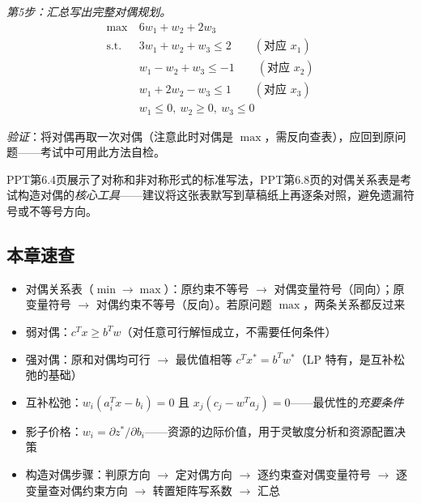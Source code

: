 {\emph{第5步：汇总写出完整对偶规划。}
\[
\begin{aligned}
\max\ & 6w_1 + w_2 + 2w_3 \\
\text{s.t.}\ & 3w_1 + w_2 + w_3 \le 2 \qquad (\text{对应 } x_1)\\
& w_1 - w_2 + w_3 \le -1 \qquad (\text{对应 } x_2)\\
& w_1 + 2w_2 - w_3 \le 1 \qquad (\text{对应 } x_3)\\
& w_1 \le 0,\ w_2 \ge 0,\ w_3 \le 0
\end{aligned}
\]

\emph{验证}：将对偶再取一次对偶（注意此时对偶是 $\max$，需反向查表），应回到原问题——考试中可用此方法自检。

\medskip
PPT第6.4页展示了对称和非对称形式的标准写法，PPT第6.8页的对偶关系表是考试构造对偶的\emph{核心工具}——建议将这张表默写到草稿纸上再逐条对照，避免遗漏符号或不等号方向。
\medskip
{}
\medskip}


\clearpage\subsection{本章速查}

\begin{itemize}
  \item 对偶关系表（$\min\to\max$）：原约束不等号 $\to$ 对偶变量符号（同向）；原变量符号 $\to$ 对偶约束不等号（反向）。若原问题 $\max$，两条关系都反过来
  \item 弱对偶：$c^T x \ge b^T w$（对任意可行解恒成立，不需要任何条件）
  \item 强对偶：原和对偶均可行 $\to$ 最优值相等 $c^T x^* = b^T w^*$（LP 特有，是互补松弛的基础）
  \item 互补松弛：$w_i(a_i^T x-b_i)=0$ 且 $x_j(c_j-w^T a_j)=0$——最优性的\emph{充要条件}
  \item 影子价格：$w_i = \partial z^*/\partial b_i$——资源的边际价值，用于灵敏度分析和资源配置决策
  \item 构造对偶步骤：判原方向 $\to$ 定对偶方向 $\to$ 逐约束查对偶变量符号 $\to$ 逐变量查对偶约束方向 $\to$ 转置矩阵写系数 $\to$ 汇总
\end{itemize}
